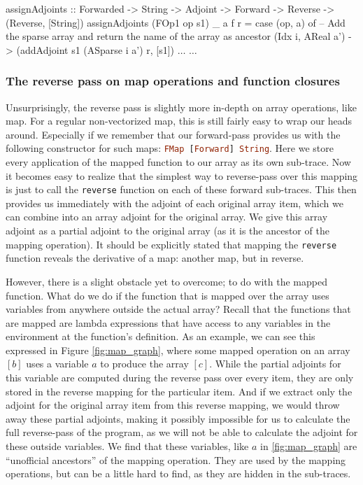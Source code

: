         \begin{haskell}[caption={Defining \texttt{assignAdjoints} for the indexing operation}, label=lst:assign_idx, gobble=12]
            assignAdjoints :: Forwarded -> String -> Adjoint -> Forward -> Reverse
                -> (Reverse, [String])
            assignAdjoints (FOp1 op s1) _ a f r = case (op, a) of
                -- Add the sparse array and return the name of the array as ancestor
                (Idx i, AReal a') -> (addAdjoint s1 (ASparse i a') r, [s1])
                $\dots$
            $\dots$
        \end{haskell}

        \subsubsection{The reverse pass on map operations and function closures}
            Unsurprisingly, the reverse pass is slightly more in-depth on array operations, like map.
            For a regular non-vectorized map, this is still fairly easy to wrap our heads around.
            Especially if we remember that our forward-pass provides us with the following constructor for such maps:
            \lstinline[language=haskell]{FMap [Forward] String}.
            Here we store every application of the mapped function to our array as its own sub-trace.
            Now it becomes easy to realize that the simplest way to reverse-pass over this mapping is just to call the \texttt{reverse} function on each of these forward sub-traces.
            This then provides us immediately with the adjoint of each original array item, which we can combine into an array adjoint for the original array.
            We give this array adjoint as a partial adjoint to the original array (as it is the ancestor of the mapping operation).
            It should be explicitly stated that mapping the \texttt{reverse} function reveals the derivative of a map: another map, but in reverse.

            However, there is a slight obstacle yet to overcome; to do with the mapped function.
            What do we do if the function that is mapped over the array uses variables from anywhere outside the actual array?
            Recall that the functions that are mapped are lambda expressions that have access to any variables in the environment at the function's definition.
            As an example, we can see this expressed in Figure \ref{fig:map_graph}, where some mapped operation on an array $[b]$ uses a variable $a$ to produce the array $[c]$.
            While the partial adjoints for this variable are computed during the reverse pass over every item, they are only stored in the reverse mapping for the particular item.
            And if we extract only the adjoint for the original array item from this reverse mapping, we would throw away these partial adjoints, making it possibly impossible for us to calculate the full reverse-pass of the program, as we will not be able to calculate the adjoint for these outside variables.
            We find that these variables, like $a$ in \ref{fig:map_graph} are ``unofficial ancestors'' of the mapping operation.
            They are used by the mapping operations, but can be a little hard to find, as they are hidden in the sub-traces.

